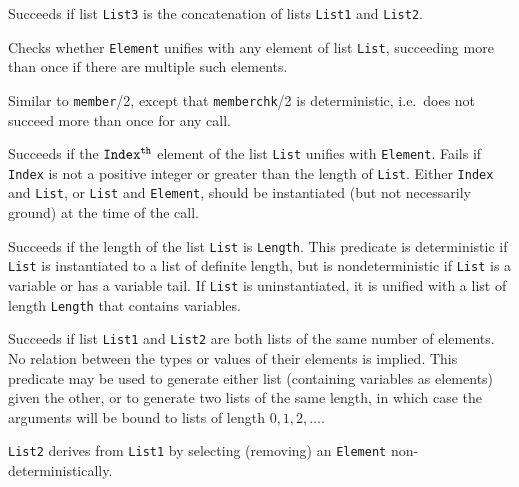 \begin{description}
    Succeeds if list {\tt List3} is the concatenation of lists 
    {\tt List1} and {\tt List2}.

    Checks whether {\tt Element} unifies with any element of list 
    {\tt List}, succeeding more than once if there are multiple 
    such elements.

    Similar to {\tt member}/2, except that {\tt memberchk}/2 is
    deterministic, i.e.\ does not succeed more than once for any call.

    Succeeds if the ${\tt Index^{th}}$ element of the list {\tt List} 
    unifies with {\tt Element}.  Fails if {\tt Index} is not a positive
    integer or greater than the length of {\tt List}.
    Either {\tt Index} and {\tt List}, or {\tt List} and {\tt Element}, 
    should be instantiated (but not necessarily ground) at the time of 
    the call.

    Succeeds if the length of the list {\tt List} is {\tt Length}.
    This predicate is deterministic if {\tt List} is instantiated 
    to a list of definite length, but is nondeterministic if 
    {\tt List} is a variable or has a variable tail.  If {\tt List}
    is uninstantiated, it is unified with a list of length {\tt Length}
    that contains variables.

    Succeeds if list {\tt List1} and {\tt List2} are both lists of
    the same number of elements.  No relation between the types or
    values of their elements is implied.  This predicate may be used
    to generate either list (containing variables as elements) given
    the other, or to generate two lists of the same length, in which
    case the arguments will be bound to lists of length $0,1,2,\ldots$.

    {\tt List2} derives from {\tt List1} by selecting (removing) an 
    {\tt Element} non-deterministically.


\end{description}

